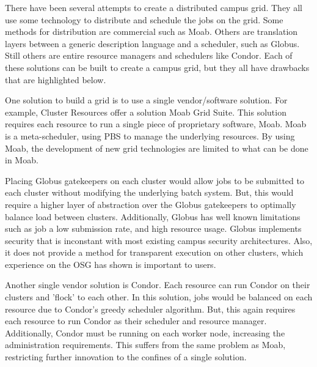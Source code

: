 \documentclass[11pt]{article}
\begin{document}

There have been several attempts to create a distributed campus grid.  They all use some technology to distribute and schedule the jobs on the grid.  Some methods for distribution are commercial such as Moab.  Others are translation layers between a generic description language and a scheduler, such as Globus.  Still others are entire resource managers and schedulers like Condor.  Each of these solutions can be built to create a campus grid, but they all have drawbacks that are highlighted below.

One solution to build a grid is to use a single vendor/software solution.  For example, Cluster Resources offer a solution Moab Grid Suite\cite{website:moabgrid}.  This solution requires each resource to run a single piece of proprietary software, Moab.  Moab is a meta-scheduler, using PBS to manage the underlying resources.  By using Moab, the development of new grid technologies are limited to what can be done in Moab.

Placing Globus gatekeepers on each cluster would allow jobs to be submitted to each cluster without modifying the underlying batch system.  But, this would require a higher layer of abstraction over the Globus gatekeepers to optimally balance load between clusters.  Additionally, Globus has well known limitations such as job a low submission rate, and high resource usage.  Globus implements security that is inconstant with most existing campus security architectures.  Also, it does not provide a method for transparent execution on other clusters, which experience on the OSG has shown is important to users.

Another single vendor solution is Condor.  Each resource can run Condor on their clusters and 'flock' \cite{epema1996worldwide} to each other.  In this solution, jobs would be balanced on each resource due to Condor's greedy scheduler algorithm.  But, this again requires each resource to run Condor as their scheduler and resource manager.  Additionally, Condor must be running on each worker node, increasing the administration requirements.  This suffers from the same problem as Moab, restricting further innovation to the confines of a single solution.



\end{document}
